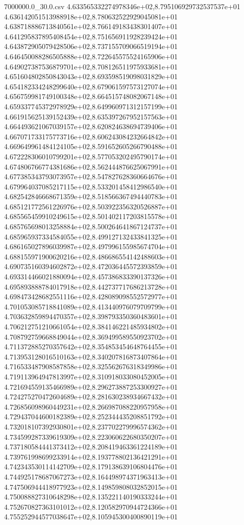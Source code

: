 \begin{filecontents*}{7000000.0_30.0.csv}
4.633565332274978346e+02,8.795106929732537537e+01
4.636142051513988918e+02,8.780632522929045081e+01
4.638718886713840561e+02,8.766149183438301407e+01
4.641295837895408454e+02,8.751656911928239424e+01
4.643872905079428506e+02,8.737155709066519194e+01
4.646450088286505888e+02,8.722645575524165906e+01
4.649027387536879701e+02,8.708126511975933681e+01
4.651604802850843043e+02,8.693598519098031829e+01
4.654182334248299640e+02,8.679061597573127074e+01
4.656759981749100348e+02,8.664515748082067148e+01
4.659337745372978929e+02,8.649960971312157199e+01
4.661915625139152439e+02,8.635397267952157563e+01
4.664493621067039157e+02,8.620824638694739406e+01
4.667071733175773716e+02,8.606243084232664842e+01
4.669649961484124105e+02,8.591652605266790488e+01
4.672228306010799201e+02,8.577053202495790174e+01
4.674806766774381686e+02,8.562444876625067991e+01
4.677385343793073957e+02,8.547827628360664676e+01
4.679964037085217115e+02,8.533201458412986540e+01
4.682542846668671359e+02,8.518566367494440783e+01
4.685121772561226976e+02,8.503922356320526887e+01
4.685565459910249615e+02,8.501402117203815578e+01
4.685765698013258884e+02,8.500264641867124737e+01
4.685965937334584055e+02,8.499127132433841325e+01
4.686165027896039987e+02,8.497996155985674704e+01
4.688155971900620216e+02,8.486686554142488603e+01
4.690735160394602872e+02,8.472036445572393859e+01
4.693314466021880094e+02,8.457386833390137326e+01
4.695893888784017918e+02,8.442737717686213728e+01
4.698473428682551116e+02,8.428089098552572977e+01
4.701053085718841089e+02,8.413440976079709799e+01
4.703632859894470357e+02,8.398793350360483601e+01
4.706212751210661054e+02,8.384146221485934802e+01
4.708792759668849044e+02,8.369499589550923702e+01
4.711372885270357642e+02,8.354853454648764455e+01
4.713953128016510163e+02,8.340207816873407864e+01
4.716533487908587858e+02,8.325562676318349986e+01
4.719113964947813997e+02,8.310918033080452005e+01
4.721694559135466989e+02,8.296273887253300927e+01
4.724275270472604689e+02,8.281630238934667432e+01
4.726856098960449231e+02,8.266987088220957958e+01
4.729437044600182389e+02,8.252344435208851792e+01
4.732018107392930801e+02,8.237702279996574362e+01
4.734599287339619309e+02,8.223060622680350207e+01
4.737180584441373412e+02,8.208419463361224189e+01
4.739761998699233914e+02,8.193778802136421291e+01
4.742343530114142709e+02,8.179138639106804476e+01
4.744925178687067273e+02,8.164498974371963413e+01
4.747506944418977923e+02,8.149859808032852015e+01
4.750088827310648298e+02,8.135221140190333244e+01
4.752670827363101012e+02,8.120582970944724366e+01
4.755252944577038647e+02,8.105945300400890119e+01

\end{filecontents*}

